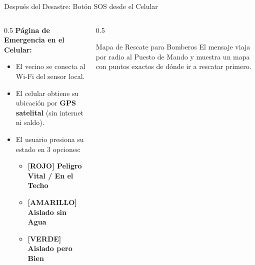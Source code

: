 \documentclass[aspectratio=169]{beamer}
\begin{document}
\begin{frame}{Después del Desastre: Botón SOS desde el Celular}
  \begin{columns}
    \begin{column}{0.5\textwidth}
      \textbf{Página de Emergencia en el Celular:}
      \begin{itemize}
        \item El vecino se conecta al Wi-Fi del sensor local.
        \item El celular obtiene su ubicación por \textbf{GPS satelital} (sin internet ni saldo).
        \item El usuario presiona su estado en 3 opciones:
          \begin{itemize}
            \item \textcolor{AlertRed}{\textbf{[ROJO] Peligro Vital / En el Techo}}
            \item \textcolor{USSGold!90!black}{\textbf{[AMARILLO] Aislado sin Agua}}
            \item \textcolor{SuccessGreen}{\textbf{[VERDE] Aislado pero Bien}}
          \end{itemize}
      \end{itemize}
    \end{column}
    \begin{column}{0.5\textwidth}
      \begin{block}{Mapa de Rescate para Bomberos}
        El mensaje viaja por radio al Puesto de Mando y muestra un mapa con puntos exactos de dónde ir a rescatar primero.
      \end{block}
    \end{column}
  \end{columns}
\end{frame}
\end{document}
